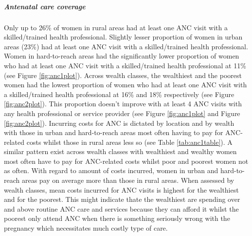 \documentclass[12pt,a4paper]{article}
\let\oldsubparagraph\subparagraph
\renewcommand{\subparagraph}[1]{\oldsubparagraph{#1}\mbox{}}
\begin{document}
\hypertarget{ancCoverage}{%
\subparagraph{Antenatal care coverage}\label{ancCoverage}}

Only up to 26\% of women in rural areas had at least one ANC visit with a skilled/trained health professional. Slightly lesser proportion of women in urban areas (23\%) had at least one ANC visit with a skilled/trained health professional. Women in hard-to-reach areas had the significantly lower proportion of women who had at least one ANC visit with a skilled/trained health professional at 11\% (see Figure \ref{fig:anc1plot}). Across wealth classes, the wealthiest and the poorest women had the lowest proportion of women who had at least one ANC visit with a skilled/trained health professional at 16\% and 18\% respectively (see Figure \ref{fig:anc2plot}). This proportion doesn't improve with at least 4 ANC visits with any health professional or service provider (see Figure \ref{fig:anc1plot} and Figure \ref{fig:anc2plot}). Incurring costs for ANC is dictated by location and by wealth with those in urban and hard-to-reach areas most often having to pay for ANC-related costs whilst those in rural areas less so (see Table \ref{tab:anc1table}). A similar pattern exist across wealth classes with wealthiest and wealthy women most often have to pay for ANC-related costs whilst poor and poorest women not as often. With regard to amount of costs incurred, women in urban and hard-to-reach areas pay on average more than those in rural areas. When assessed by wealth classes, mean costs incurred for ANC visits is highest for the wealthiest and for the poorest. This might indicate thate the wealthiest are spending over and above routine ANC care and services because they can afford it whilst the poorest only attend ANC when there is something seriously wrong with the pregnancy which necessitates much costly type of care.
\end{document}
